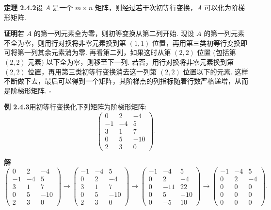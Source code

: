 \documentclass[UTF8,12pt,a4paper,fontset=fandol]{ctexart}
\begin{document}
\noindent\textbf{定理 2.4.2}\quad 设 $A$ 是一个 $m\times n$ 矩阵，则经过若干次初等行变换，$A$ 可以化为阶梯形矩阵.

\noindent\textbf{证明}\quad 若 $A$ 的第一列元素全为零，则初等变换从第二列开始. 现设 $A$ 的第一列元素不全为零，则用行对换将非零元素换到第 $(1,1)$ 位置，再用第三类初等行变换即可将第一列其余元素消为零. 再看第二列，如果这时从第 $(2,2)$ 位置 (包括第 $(2,2)$ 元素) 以下全为零，则移至下一列. 若否，用行对换将非零元素换到第 $(2,2)$ 位置，再用第三类初等行变换消去这一列第 $(2,2)$ 位置以下的元素. 这样不断做下去，最后可以得到一个矩阵，其阶梯点的列指标随着行数严格递增，从而是阶梯形矩阵. $\square$

\noindent\textbf{例 2.4.3}\quad 用初等行变换化下列矩阵为阶梯形矩阵:
\[
\left(\begin{array}{ccc}
0 & 2 & -4\\
-1 & -4 & 5\\
3 & 1 & 7\\
0 & 5 & -10\\
2 & 3 & 0
\end{array}\right).
\]

\noindent\textbf{解}\quad
\[
\left(\begin{array}{ccc}
0 & 2 & -4\\
-1 & -4 & 5\\
3 & 1 & 7\\
0 & 5 & -10\\
2 & 3 & 0
\end{array}\right)
\longrightarrow
\left(\begin{array}{ccc}
-1 & -4 & 5\\
0 & 2 & -4\\
3 & 1 & 7\\
0 & 5 & -10\\
2 & 3 & 0
\end{array}\right)
\longrightarrow
\left(\begin{array}{ccc}
-1 & -4 & 5\\
0 & 2 & -4\\
0 & -11 & 22\\
0 & 5 & -10\\
0 & -5 & 10
\end{array}\right)
\longrightarrow
\left(\begin{array}{ccc}
-1 & -4 & 5\\
0 & 2 & -4\\
0 & 0 & 0\\
0 & 0 & 0\\
0 & 0 & 0
\end{array}\right).
\]
\end{document}
